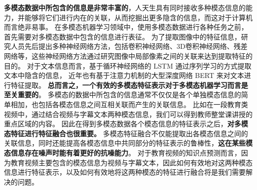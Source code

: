     \textbf{多模态数据中所包含的信息是非常丰富的}，人天生具有同时接收多种模态信息的能力，并能够将它们进行内在的关联，从而挖掘出更多隐含的信息，而这对于计算机而言绝非易事。
    在多模态机器学习领域中，使用多模态数据进行各种任务之前，首先需要对多模态数据中包含的信息进行表征。
    为了提取图像中的特征信息，研究人员先后提出多种神经网络方法，包括卷积神经网络\cite{Krizhevsky2012ImageNetCW}、3D卷积神经网络\cite{Tran2015LearningSF}、残差网络\cite{He2016DeepRL}等，这些神经网络方法通过研究图像中局部像素之间的关联来达到提取特征的目的。
    对于文本信息而言，基于循环神经网络的 LSTM\cite{Hochreiter1997LongSM} 通过序列学习的方式提取文本中隐含的信息，
    近年也有基于注意力机制的大型深度网络 BERT\cite{Devlin2019BERTPO} 来对文本进行特征提取。
    \textbf{总而言之，一个有效的多模态特征表示对于多模态机器学习而言是至关重要的}\cite{Baltruaitis2019MultimodalML}。
    多模态的数据中所包含的信息通常不仅仅是各个单独模态信息的简单相加，也包括各模态信息之间互相关联而产生的关联信息。
    比如在一段教育类视频中，通过结合视频与字幕文本两种模态信息，我们可以得到教师整堂课讲授的重点区域的内容。 
    因此在得到多模态数据各个模态信息的特征表示之后，\textbf{对多模态特征进行特征融合也很重要。}
    多模态特征融合不仅能提取出各模态信息之间的关联信息，同时还能提高各模态信息中共同部分的特征表示的鲁棒性\cite{Baltruaitis2019MultimodalML}，\textbf{这在某些模态信息存在噪声时能有着更好的抗噪能力}。
    对于教育视频的知识点预测而言，因为教育视频主要包含的模态信息为视频与字幕文本，因此如何有效地对这两种模态信息进行特征表示，以及如何有效地将这两种模态的特征进行融合将是我们需要解决的问题。

